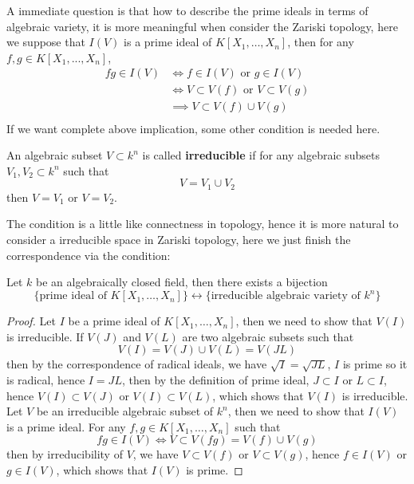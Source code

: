 \documentclass[12pt,a4paper]{article}
\begin{document}
A immediate question is that how to describe the prime ideals in terms of algebraic variety, it is more meaningful when consider the Zariski topology, here we suppose that \(I(V)\) is a prime ideal of \(K[X_1,\dots,X_n]\), then for any \(f,g \in K[X_1,...,X_n]\),
\begin{align*}
    fg \in I(V) &\iff f \in I(V) \text{ or } g \in I(V)\\
    &\iff V \subset V(f) \text{ or } V \subset V(g)\\
    &\implies V \subset V(f)\cup V(g)\\
\end{align*}
If we want complete above implication, some other condition is needed here.
\begin{definitionplain}
    An algebraic subset \(V \subset k^n\) is called \textbf{irreducible} if for any algebraic subsets \(V_1,V_2 \subset k^n\) such that
    \[V = V_1 \cup V_2\]
    then \(V = V_1\) or \(V = V_2\).\\
\end{definitionplain}

The condition is a little like connectness in topology, hence it is more natural to consider a irreducible space in Zariski topology, here we just finish the correspondence via the condition:

\begin{proposition}
    Let \(k\) be an algebraically closed field, then there exists a bijection
    \[\{\text{prime ideal of } K[X_1,\dots,X_n]\} \longleftrightarrow \{\text{irreducible algebraic variety of } k^n\}\]
\end{proposition}
\begin{proof}
    Let \(I\) be a prime ideal of \(K[X_1,\dots,X_n]\), then we need to show that \(V(I)\) is irreducible. If \(V(J)\) and \(V(L)\) are two algebraic subsets such that
    \[V(I) = V(J) \cup V(L) = V(JL)\]
    then by the correspondence of radical ideals, we have \(\sqrt{I} = \sqrt{JL}\), \(I\) is prime so it is radical, hence \(I = JL\), then by the definition of prime ideal, \(J \subset I\) or \(L \subset I\), hence \(V(I) \subset V(J)\) or \(V(I) \subset V(L)\), which shows that \(V(I)\) is irreducible.\\

    Let \(V\) be an irreducible algebraic subset of \(k^n\), then we need to show that \(I(V)\) is a prime ideal. For any \(f,g \in K[X_1,\dots,X_n]\) such that
    \[fg \in I(V) \iff V \subset V(fg) = V(f) \cup V(g)\]
    then by irreducibility of \(V\), we have \(V \subset V(f)\) or \(V \subset V(g)\), hence \(f \in I(V)\) or \(g \in I(V)\), which shows that \(I(V)\) is prime.
\end{proof}
\end{document}

